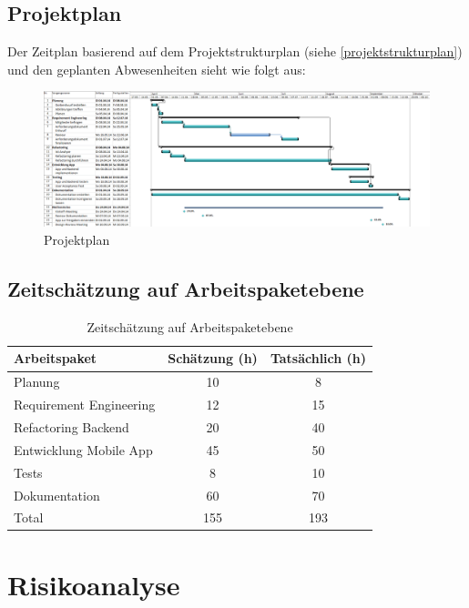 \begin{landscape}
\thispagestyle{empty}
\subsection{Projektplan}\label{projektplan}
Der Zeitplan basierend auf dem Projektstrukturplan (siehe \ref{projektstrukturplan})  und den geplanten Abwesenheiten sieht wie folgt aus:
\begin{figure}[h]
\centering
\includegraphics[scale=0.5]{images/project/projectplan.png}
\caption{Projektplan}
\label{fig:psp}
\end{figure}

\end{landscape}

\subsection{Zeitschätzung auf Arbeitspaketebene}
\begin{table}[ht]
\centering
  \begin{tabular}{ l | c | c }
	\hline
	\rowcolor{gray}
	Arbeitspaket							&	Schätzung (h)	& Tatsächlich (h)	\\ \hline
	Planung							&	10			& 8	\\ \hline
	Requirement Engineering					&	12			& 15	\\ \hline
	Refactoring Backend					&	20			& 40	\\ \hline
	Entwicklung Mobile App					&	45			& 50	\\ \hline
	Tests								&	8			& 10	\\ \hline
	Dokumentation						&	60			& 70	\\ \hline \hline
	Total								&	155			& 193	\\ \hline
  \end{tabular}
   \caption{Zeitschätzung auf Arbeitspaketebene}\label{table:time_estimation}
\end{table}

\section{Risikoanalyse}\label{risikoanalyse}

